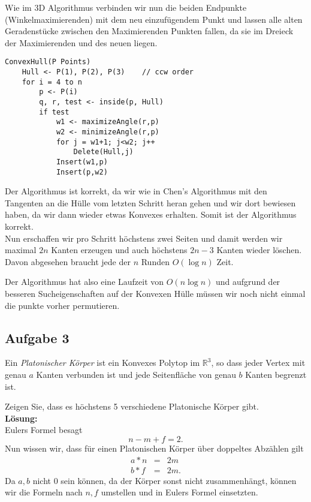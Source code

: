 \documentclass[11pt,a4paper,ngerman]{article}
\begin{document}
Wie im 3D Algorithmus verbinden wir nun die beiden Endpunkte (Winkelmaximierenden) mit dem neu einzufügendem Punkt und lassen alle alten Geradenstücke
zwischen den Maximierenden Punkten fallen, da sie im Dreieck der Maximierenden
und des neuen liegen.\\

\begin{lstlisting}[frame=single]
ConvexHull(P Points)
    Hull <- P(1), P(2), P(3)    // ccw order
    for i = 4 to n
        p <- P(i)
        q, r, test <- inside(p, Hull)
        if test
            w1 <- maximizeAngle(r,p)
            w2 <- minimizeAngle(r,p)
            for j = w1+1; j<w2; j++
                Delete(Hull,j)
            Insert(w1,p)
            Insert(p,w2)
\end{lstlisting}

Der Algorithmus ist korrekt, da wir wie in Chen's Algorithmus mit
den Tangenten an die Hülle vom letzten Schritt heran gehen und wir dort
bewiesen haben, da wir dann wieder etwas Konvexes erhalten. Somit ist
der Algorithmus korrekt.\\

Nun erschaffen wir pro Schritt höchstens zwei Seiten und damit
werden wir maximal $2n$ Kanten erzeugen und auch höchstens $2n-3$ Kanten
wieder löschen.
Davon abgesehen braucht jede der $n$ Runden $O(\log n)$ Zeit.

Der Algorithmus hat also eine Laufzeit von $O(n \log n)$ und aufgrund
der besseren Sucheigenschaften auf der Konvexen Hülle müssen wir noch nicht
einmal die punkte vorher permutieren.

\subsection*{Aufgabe 3}

Ein \emph{Platonischer Körper} ist ein Konvexes Polytop im $\mathbb{R}^3$, so
dass jeder Vertex mit genau $a$ Kanten verbunden ist und jede Seitenfläche
von genau $b$ Kanten begrenzt ist.

Zeigen Sie, dass es höchstens 5 verschiedene Platonische Körper gibt.\\

\textbf{Lösung:}\\

Eulers Formel besagt
$$
    n - m + f = 2.
$$
Nun wissen wir, dass für einen Platonischen Körper über doppeltes Abzählen
gilt
$$ \begin{array}{rcl}
    a*n &=& 2m\\
    b*f &=& 2m.    
\end{array}$$
Da $a,b$ nicht $0$ sein können, da der Körper sonst nicht zusammenhängt,
können wir die Formeln nach $n,f$ umstellen und in Eulers Formel einsetzten.
\end{document}
